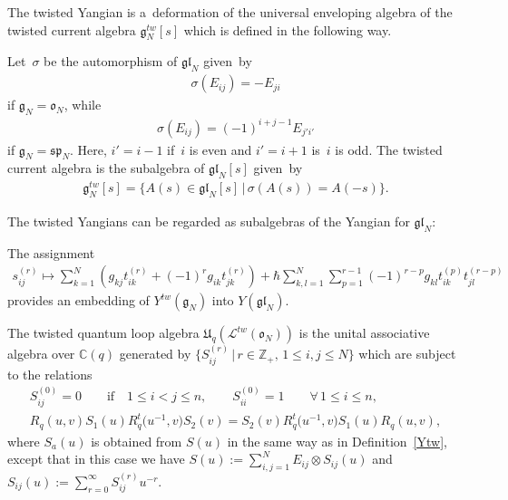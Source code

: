 The twisted Yangian is a~deformation of the universal enveloping algebra of the twisted current algebra
$\mathfrak{g}_N^{tw}[s]$ which is def\/ined in the following way.

\begin{definition}
Let~$\sigma$ be the automorphism of $\mathfrak{gl}_N$ given~by
\begin{gather}
\label{orthauto}
\sigma(E_{ij})=-E_{ji}
\end{gather}
if $\mathfrak{g}_N=\mathfrak{o}_N$, while
\begin{gather}
\label{sympauto}
\sigma(E_{ij})=(-1)^{i+j-1}E_{j'i'}
\end{gather}
if $\mathfrak{g}_N=\mathfrak{sp}_N$.
Here, $i'=i-1$ if~$i$ is even and $i'=i+1$ is~$i$ is odd.
The twisted current algebra is the subalgebra of $\mathfrak{gl}_N[s]$ given~by
\begin{gather*}
\mathfrak{g}_N^{tw}[s] = \{A(s) \in \mathfrak{gl}_N[s] \,|\, \sigma(A(s))=A(-s)\}.
\end{gather*}
\end{definition}

The twisted Yangians can be regarded as subalgebras of the Yangian for $\mathfrak{gl}_N$:

\begin{proposition}[\cite{Ol}]
\label{embY}
The assignment
\begin{gather*}
s_{ij}^{(r)} \mapsto \sum\limits_{k=1}^N \left(g_{kj}t_{ik}^{(r)} + (-1)^r g_{ik} t_{jk}^{(r)} \right) + \hbar
\sum\limits_{k,l=1}^N \sum\limits_{p=1}^{r-1} (-1)^{r-p} g_{kl} t_{ik}^{(p)} t_{jl}^{(r-p)}
\end{gather*}
provides an embedding of $Y^{tw}(\mathfrak{g}_N)$ into $Y(\mathfrak{gl}_N)$.
\end{proposition}

\begin{definition}
\label{Uqon}
The twisted quantum loop algebra $\mathfrak{U}_q(\mathcal{L}^{tw}(\mathfrak{o}_N))$ is the unital associative algebra
over $\mathbb{C}(q)$ generated by $\{S_{ij}^{(r)} \,|\, r \in \mathbb{Z}_+, \, 1 \leq i, j \leq N\}$ which are subject to the
relations
\begin{gather*}
S_{ij}^{(0)}=0 \qquad \text{if} \quad  1 \leq i < j \leq n,
\qquad
S_{ii}^{(0)}=1 \qquad \forall\,  1 \leq i \leq n,
\\
R_q(u,v)S_1(u)R_q^t\big(u^{-1},v\big)S_2(v)=S_2(v)R_q^t\big(u^{-1},v\big)S_1(u)R_q(u,v),
\end{gather*}
where $S_a(u)$ is obtained from $S(u)$ in the same way as in Def\/inition~\ref{Ytw}, except that in this case we have
$S(u):=\sum\limits_{i,j=1}^N E_{ij} \otimes S_{ij}(u)$ and $S_{ij}(u):=\sum\limits_{r=0}^\infty S_{ij}^{(r)}u^{-r}$.
\end{definition}

